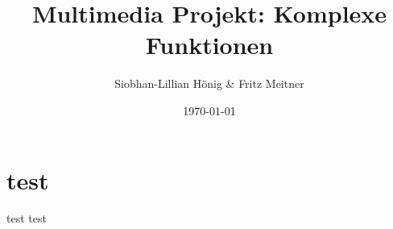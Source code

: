 \documentclass[11pt]{article}
\title{\textbf{Multimedia Projekt: Komplexe Funktionen}}
\author{Siobhan-Lillian Hönig & Fritz Meitner}
\date{\today}
\begin{document}
    
\begin{titlepage}
    \maketitle
\end{titlepage}

\pagebreak

\pagebreak
\tableofcontents
\pagebreak

\section{test}

test
test



\end{document}
